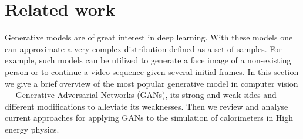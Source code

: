 

\section{Related work}
Generative models are of great interest in deep learning. With these models one can approximate a very complex distribution defined as a set of samples. 
For example, such models can be utilized to generate a face image of a non-existing person or to continue a video sequence given several initial frames. 
In this section we give a brief overview of the most popular generative model in computer vision — Generative Adversarial Networks (GANs),
 its strong and weak sides and different modifications to alleviate its weaknesses. Then we review and analyse current approaches for applying GANs to 
the simulation of calorimeters in High energy physics.

